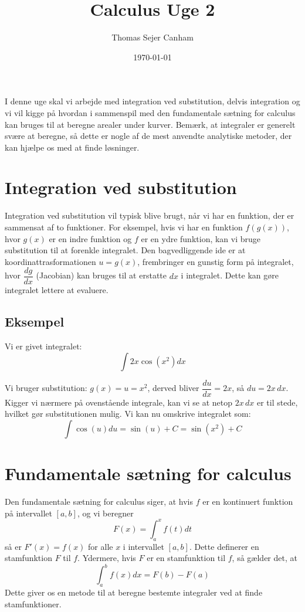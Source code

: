 \documentclass{article}
\title{Calculus Uge 2}
\author{Thomas Sejer Canham}
\date{\today}
\theoremstyle{definition}
\theoremstyle{remark}
\begin{document}

\begin{titlepage}

    \maketitle


I denne uge skal vi arbejde med integration ved substitution, delvis integration og vi vil kigge på hvordan i sammenspil med den fundamentale sætning for calculus kan bruges til at beregne arealer under kurver. Bemærk, at integraler er generelt svære at beregne, så dette er nogle af de mest anvendte analytiske metoder, der kan hjælpe os med at finde løsninger.
\section*{Integration ved substitution}
Integration ved substitution vil typisk blive brugt, når vi har en funktion, der er sammensat af to funktioner. For eksempel, hvis vi har en funktion $f(g(x))$, hvor $g(x)$ er en indre funktion og $f$ er en ydre funktion, kan vi bruge substitution til at forenkle integralet. Den bagvedliggende ide er at koordinattrasformationen $u = g(x)$, frembringer en gunstig form på integralet, hvor $\dfrac{dg}{dx}$ (Jacobian) kan bruges til at erstatte $dx$ i integralet. Dette kan gøre integralet lettere at evaluere.
\subsection*{Eksempel}
Vi er givet integralet:
\begin{equation}
    \int 2x \cos(x^2) dx
\end{equation}

Vi bruger substitution: $g(x) = u = x^2$, derved bliver $\dfrac{du}{dx} = 2x$, så $du = 2x \, dx$. Kigger vi nærmere på ovenstående integrale, kan vi se at netop $2x \, dx$ er til stede, hvilket gør substitutionen mulig. Vi kan nu omskrive integralet som:
\begin{equation}
    \int \cos(u) du = \sin(u) + C = \sin(x^2) + C
\end{equation}

\section*{Fundamentale sætning for calculus}
Den fundamentale sætning for calculus siger, at hvis $f$ er en kontinuert funktion på intervallet $[a, b]$, og vi beregner
\begin{equation}
    F(x) = \int_a^x f(t) dt
\end{equation}
så er $F'(x) = f(x)$ for alle $x$ i intervallet $[a, b]$. Dette definerer en stamfunktion $F$ til $f$. Ydermere, hvis $F$ er en stamfunktion til $f$, så gælder det, at
\begin{equation}
    \int_a^b f(x) dx = F(b) - F(a)
\end{equation}
Dette giver os en metode til at beregne bestemte integraler ved at finde stamfunktioner. 



\end{titlepage}
\end{document}

